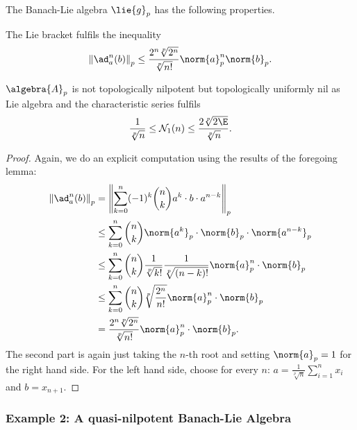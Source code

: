 \documentclass[
11pt,                          %
english                        %
]{article}
\begin{document}
\begin{lemma}
	The Banach-Lie algebra $\lie{g}_p$ has the following properties.
	\begin{lemmalist}
		\item
		The Lie bracket fulfils the inequality
		\begin{equation}
			\label{eq:lemma:Ex1LiePowers}
			\left\Vert
				\ad_a^n (b)
			\right\Vert_p
			\leq
			\frac{2^n \sqrt[p]{2^n}}{\sqrt[p]{n!}}
			\norm{a}_p^n \norm{b}_p.
		\end{equation}
		
		\item
		$\algebra{A}_p$ is not topologically nilpotent but topologically uniformly 
		nil as Lie algebra and the characteristic series fulfils
		\begin{equation}
			\label{eq:lemma:Ex1LieSequence}
			\frac{1}{\sqrt[p]{n}} 
			\leq 
			\mathcal{N}_1(n)
			\leq 
			\frac{2 \sqrt[p]{2 \E}}{\sqrt[p]{n}}.
		\end{equation}	
	\end{lemmalist}
\end{lemma}
\begin{proof}
	Again, we do an explicit computation using the results of the foregoing lemma:
	\begin{align*}
		\left\Vert
			\ad_a^n(b)
		\right\Vert_p
		&=
		\left\Vert
			\sum\limits_{k = 0}^n
			(-1)^k
			\binom{n}{k}
			a^k
			\cdot b \cdot
			a^{n - k}
		\right\Vert_p
		\\
		& \leq
		\sum\limits_{k = 0}^n
		\binom{n}{k}
		\norm{a^k}_p
		\cdot \norm{b}_p \cdot
		\norm{a^{n - k}}_p
		\\
		& \leq
		\sum\limits_{k = 0}^n
		\binom{n}{k}
		\frac{1}{\sqrt[p]{k!}}
		\frac{1}{\sqrt[p]{(n - k)!}}
		\norm{a}_p^n
		\cdot \norm{b}_p
		\\
		& \leq
		\sum\limits_{k = 0}^n
		\binom{n}{k}
		\sqrt[p]{\frac{2^n}{n!}}		
		\norm{a}_p^n
		\cdot \norm{b}_p
		\\
		& =
		\frac{2^n \sqrt[p]{2^n}}{\sqrt[p]{n!}}		
		\norm{a}_p^n
		\cdot \norm{b}_p.
	\end{align*}
	The second part is again just taking the $n$-th root and setting 
	$\norm{a}_p = 1$ for the right hand side. For the left hand side, choose
	for every $n$: $a = \frac{1}{\sqrt[p]{n}} \sum_{i=1}^n x_i$ and $b = x_{n+1}$.
\end{proof}



\subsubsection{Example 2: A quasi-nilpotent Banach-Lie Algebra}
\end{document}
